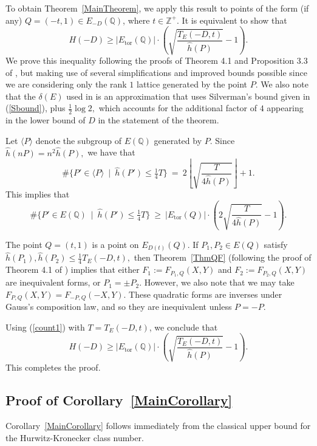 \documentclass[12pt]{amsart}
\newcommand{\Z}{\mathbb{Z}}
\newcommand{\Q}{\mathbb{Q}}
\newcommand{\tor}{\mathrm{tor}}
\numberwithin{equation}{section}
\begin{document}
To obtain Theorem~\ref{MainTheorem}, we apply this result to points of the form (if any) $Q=(-t,1)\in E_{-D}(\Q)$, where $t\in \Z^{+}.$ 
 It is equivalent to show that 
 \[
H(-D)\geq |E_\tor(\Q)|\cdot \left(\sqrt{\frac{ T_E(-D,t)}{\widehat h(P)}}-1\right).
 \]
We prove this inequality following the proofs of Theorem 4.1 and Proposition 3.3 of \cite{GO1}, but making use of several simplifications and improved bounds possible since we are considering only the rank $1$ lattice generated by the point $P$. We also note that the $\delta(E)$ used in \cite{GO1} is an approximation that uses Silverman's bound given in (\ref{Sbound}), plus $\tfrac12 \log 2,$ which accounts for the additional factor of $4$ appearing in the lower bound of $D$ in the statement of the theorem.

Let $\langle P\rangle$ denote the subgroup of $E(\Q)$ generated by $P$. Since $\widehat h(nP)=n^2\widehat h(P),$ we have that 
\[
\#\{P'\in\langle P\rangle  \ \mid \ \widehat h(P')\leq\tfrac14  T \} 
 \ = \ 2 \left\lfloor \sqrt{\frac{T}{4\widehat h(P)}}\right\rfloor+1.
\]
This implies that 
\begin{equation}\label{count1}
\#\{P'\in E(\Q)  \ \mid \ \widehat h(P')\leq \tfrac14 T\}  \ \geq \ |E_\tor(Q)|\cdot \left(2 \sqrt{\frac{T}{4\widehat h(P)}}-1\right).
\end{equation}

The point $Q=(t,1)$ is a point on $E_{D(t)}(Q).$
If $P_1, P_2\in E(Q)$ satisfy $\widehat h(P_1),\widehat h(P_2)\leq \tfrac14 T_E(-D,t),$ then Theorem~\ref{ThmQF}  (following the proof of Theorem 4.1 of \cite{GO1}) implies that either  $F_1:=F_{P_1,Q}(X,Y)$ and $F_2:=F_{P_2,Q}(X,Y)$ are inequivalent forms, or $P_1=\pm P_2$. 
   However, we also note that we may take $F_{P,Q}(X,Y)=F_{-P,Q}(-X,Y)$. These quadratic forms are inverses under Gauss's composition law, and so they are inequivalent unless $P=-P$.


Using (\ref{count1}) with $T=T_E(-D,t)$,  we conclude that 
\[
H(-D)\geq  |E_\tor(\Q)|\cdot \left(\sqrt{\frac{ T_E(-D,t)}{\widehat h(P)}}-1\right).
 \]
This completes the proof.

\subsection{Proof of Corollary~\ref{MainCorollary}}
 
Corollary~\ref{MainCorollary} follows immediately from the classical
 upper bound for the Hurwitz-Kronecker class number. 
\end{document}
